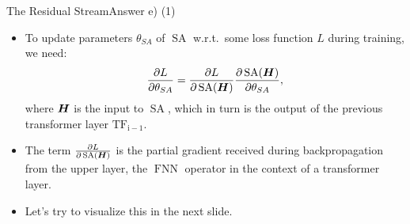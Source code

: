 \documentclass[t]{beamer}
\newcommand\op[1]{\operatorname{#1}}
\begin{document}
\begin{frame}{The Residual Stream}{Answer e) (1)}
    \begin{itemize}
        \item To update parameters $\theta_{SA}$ of $\op{SA}$ w.r.t.\ some loss
              function $L$ during training, we need:
              \begin{align}\label{eq:weight_gradient}
                  \frac{\partial L}{\partial \theta_{SA}} = \frac{\partial L}{\partial \op{SA}(\mH)}\frac{\partial \op{SA}(\mH)}{\partial \theta_{SA}},
              \end{align}
              where ${\boldsymbol{H}}$ is the input to $\op{SA}$, which in turn is the output
              of the previous transformer layer $\op{TF_{i-1}}$.
        \item The term $\frac{\partial L}{\partial \op{SA}(\mH)}$ is the partial
              gradient received during backpropagation from the upper layer, the
              $\op{FNN}$ operator in the context of a transformer layer.
        \item Let's try to visualize this in the next slide.
    \end{itemize}
\end{frame}
\end{document}
